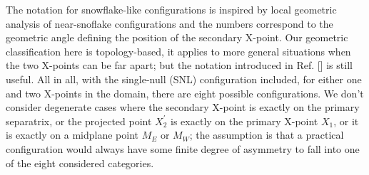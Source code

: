 The notation for snowflake-like configurations is inspired by local
geometric analysis of near-snoflake configurations and the numbers
correspond to the geometric angle defining the position of the
secondary X-point. Our geometric classification here is
topology-based, it applies to more general situations when the two
X-points can be far apart; but the notation introduced in Ref. [] is
still useful. All in all, with the single-null (SNL) configuration
included, for either one and two X-points in the domain, there are
eight possible configurations. We don't consider degenerate cases
where the secondary X-point is exactly on the primary separatrix, or
the projected point $X^{\prime}_2$ is exactly on the primary X-point
$X_1$, or it is exactly on a midplane point $M_E$ or $M_W$; the
assumption is that a practical configuration would always have some
finite degree of asymmetry to fall into one of the eight considered
categories.
